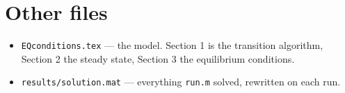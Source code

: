 \documentclass[11pt]{article}
\begin{document}
\section*{Other files}

\begin{itemize}

\item \texttt{EQconditions.tex} --- the model. Section 1 is the transition
algorithm, Section 2 the steady state, Section 3 the equilibrium conditions.

\item \texttt{results/solution.mat} --- everything \texttt{run.m} solved,
rewritten on each run.

\end{itemize}
\end{document}
